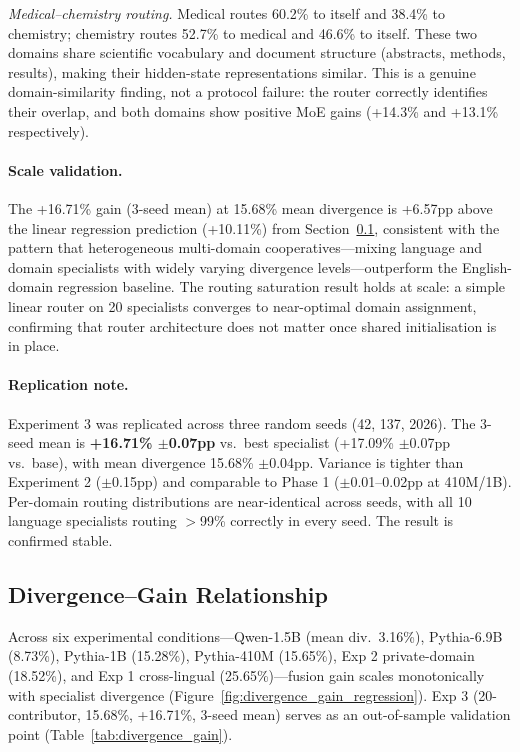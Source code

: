 \documentclass{article}
\begin{document}
\emph{Medical--chemistry routing.} Medical routes 60.2\% to itself and 38.4\% to chemistry; chemistry routes 52.7\% to medical and 46.6\% to itself. These two domains share scientific vocabulary and document structure (abstracts, methods, results), making their hidden-state representations similar. This is a genuine domain-similarity finding, not a protocol failure: the router correctly identifies their overlap, and both domains show positive MoE gains (+14.3\% and +13.1\% respectively).

\paragraph{Scale validation.} The +16.71\% gain (3-seed mean) at 15.68\% mean divergence is +6.57pp above the linear regression prediction (+10.11\%) from Section~\ref{sec:divergence_gain}, consistent with the pattern that heterogeneous multi-domain cooperatives---mixing language and domain specialists with widely varying divergence levels---outperform the English-domain regression baseline. The routing saturation result holds at scale: a simple linear router on 20 specialists converges to near-optimal domain assignment, confirming that router architecture does not matter once shared initialisation is in place.

\paragraph{Replication note.} Experiment 3 was replicated across three random seeds (42, 137, 2026). The 3-seed mean is \textbf{+16.71\% $\pm$0.07pp} vs.\ best specialist (+17.09\% $\pm$0.07pp vs.\ base), with mean divergence 15.68\% $\pm$0.04pp. Variance is tighter than Experiment 2 ($\pm$0.15pp) and comparable to Phase 1 ($\pm$0.01--0.02pp at 410M/1B). Per-domain routing distributions are near-identical across seeds, with all 10 language specialists routing $>$99\% correctly in every seed. The result is confirmed stable.

\subsection{Divergence--Gain Relationship}
\label{sec:divergence_gain}

Across six experimental conditions---Qwen-1.5B (mean div.\ 3.16\%), Pythia-6.9B (8.73\%), Pythia-1B (15.28\%), Pythia-410M (15.65\%), Exp 2 private-domain (18.52\%), and Exp 1 cross-lingual (25.65\%)---fusion gain scales monotonically with specialist divergence (Figure~\ref{fig:divergence_gain_regression}). Exp 3 (20-contributor, 15.68\%, +16.71\%, 3-seed mean) serves as an out-of-sample validation point (Table~\ref{tab:divergence_gain}).
\end{document}
